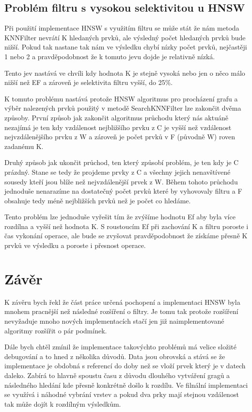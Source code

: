 \documentclass[czech,semestral,dept460,male,csharp,cpdeclaration]{diploma}
\begin{document}
		\section{Problém filtru s vysokou selektivitou u HNSW}
		
			Při použití implementace HNSW s využitím filtru se může stát že nám metoda KNNFilter nevrátí K hledaných prvků, ale výsledný počet hledaných prvků bude nižší. Pokud tak nastane tak nám ve výsledku chybí nízky počet prvků, nejčastěji 1 nebo 2 a pravděpodobnost že k tomuto jevu dojde je relativně nízká.
			
			Tento jev nastává ve chvíli kdy hodnota K je stejně vysoká nebo jen o něco málo nižší než EF a zároveň je selektivita filtru vyšší, do 25\%.
			
			K tomuto problému nastává protože HNSW algoritmus pro procházení grafu a výběr nalezených prvků použitý v metodě SearchKNNFilter lze zakončit dvěma způsoby. První způsob jak zakončit algoritmus průchodu který nás aktuáně nezajímá je ten kdy vzdálenost nejbližšího prvku z C je vyšší než vzdálenost nejvzdálenějšího prvku z W a zároveň je počet prvků v F (původně W) roven zadanému K.
			
			Druhý způsob jak ukončit průchod, ten který způsobí problém, je ten kdy je C prázdný. Stane se tedy že projdeme prvky z C a všechny jejich nenavštívené sousedy kteří jsou blíže než nejvzdálenější prvek z W. Během tohoto průchodu jednoduše nenarazíme na dostatečný počet prvků které by vyhovovaly filtru a F obsahuje tedy méně nejbližších prvků než je počet co hledáme.
			
			Tento problém lze jednoduše vyřešit tím že zvýšíme hodnotu Ef aby byla více rozdílna a vyšší než hodnota K. S roustoucím Ef při zachování K a filtru poroste i čas vykonání operace, ale bude se zvyšovat pravděpodobnost že získáme přesně K prvků ve výsledku a poroste i přesnost operace.
	
	\chapter{Závěr}
	
		K závěru bych řekl že část práce určená pochopení a implementaci HNSW byla mnohem pracnější než následné rozšíření o filtry. Je tomu tak protože rozšíření nevyžaduje mnoho nových implementacích stačí jen již naimplementované algoritmy rozšířit o pár podmínek.
		
		Dále bych chtěl zmínil že implementace takovýchto problémů má velice složité debugování a to hned z několika důvodů. Data jsou obrovská a stává se že implementace je obdobná s referencí do doby než se vloží prvek který je v datech daleko. Zabírá to hlavně spoustu času z důvodu dlouhého vytváření gragů a následného hledání kde přesně konkrétně došlo k rozdílu. Ve filnální implementaci se využívá i náhodné vybrání vrstev a pokud dva prky mají stejnou vzdálenost tak může dojít k rozdílným výsledkům. 
		
\end{document}
